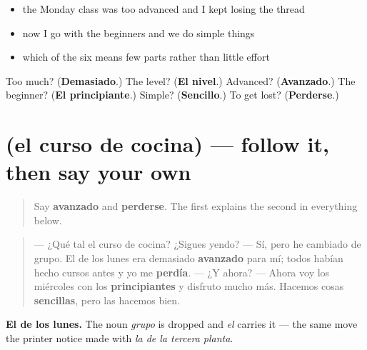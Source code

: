 \begin{itemize}
\raggedright
  \item the Monday class was too advanced and I kept losing the thread
  \item now I go with the beginners and we do simple things
  \item which of the six means few parts rather than little effort
\end{itemize}

\begin{tcolorbox}[breakable,colback=teal!4,colframe=teal!35!black,title={Before you move on}]
Too much? (\textbf{Demasiado}.) The level? (\textbf{El nivel}.) Advanced? (\textbf{Avanzado}.) The beginner? (\textbf{El principiante}.) Simple? (\textbf{Sencillo}.) To get lost? (\textbf{Perderse}.)
\end{tcolorbox}
\section[Practice]{(el curso de cocina) — follow it, then say your own}

\label{lesson:ES-C471-sintesis-curso}



\begin{quote}
Say \textbf{avanzado} and \textbf{perderse}. The first explains the second in everything below.
\end{quote}

\begin{tcolorbox}[breakable,skin=enhanced,colback=orange!6,colframe=orange!45!black,boxrule=0.5pt,arc=1mm,left=6pt,right=6pt,top=4pt,bottom=4pt,fonttitle=\bfseries,title={Read this}]
\begin{quote}
— ¿Qué tal el curso de cocina? ¿Sigues yendo? — Sí, pero he cambiado de grupo. El de los lunes era demasiado \textbf{avanzado}   para mí; todos habían hecho cursos antes y yo me \textbf{perdía}. — ¿Y ahora? — Ahora voy los miércoles con los \textbf{principiantes} y disfruto mucho más.   Hacemos cosas \textbf{sencillas}, pero las hacemos bien.
\end{quote}

\textbf{El de los lunes.} The noun \emph{grupo} is dropped and \emph{el} carries it — the same move the printer notice made with \emph{la de la tercera planta}.
\end{tcolorbox}

